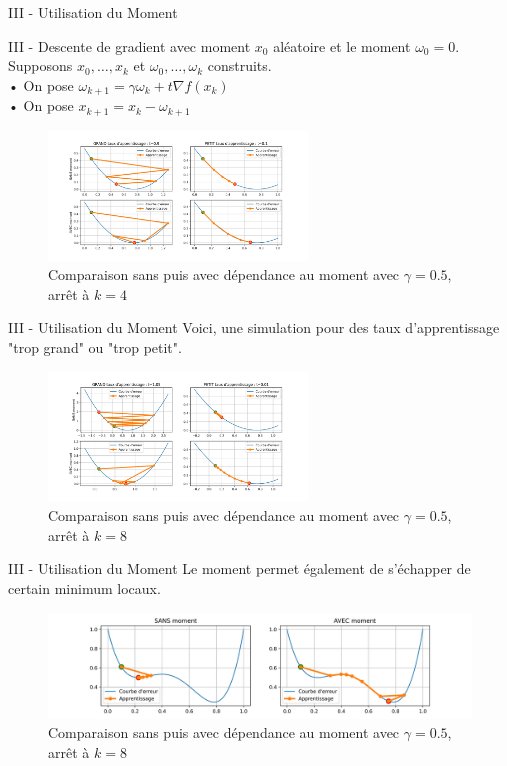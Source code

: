 \documentclass[10pt]{beamer}
\begin{document}
\begin{frame}{III - Utilisation du Moment}
\begin{block}{III - Descente de gradient avec moment}
$x_0$ aléatoire et le moment $\omega_0 = 0$.
Supposons $x_0, \ldots, x_k$ et $\omega_0, \ldots, \omega_k$ construits. \\
    • On pose $\omega_{k+1} = \gamma \omega_k + t \nabla f(x_k)$ \\
    • On pose $x_{k+1} = x_k - \omega_{k+1}$ 
\end{block}
\begin{figure}
	\centering
    \includegraphics[height=130px, trim=0 35 0 35, clip]{3-Moment.jpg}
	\caption{Comparaison sans puis avec dépendance au moment avec $\gamma = 0.5$, arrêt à $k=4$}
\end{figure}
\end{frame}

\begin{frame}{III - Utilisation du Moment}
Voici, une simulation pour des taux d'apprentissage "trop grand" ou "trop petit".
\begin{figure}
	\centering
    \includegraphics[height=130px, trim=0 35 0 35, clip]{4-Moment.jpg}
	\caption{Comparaison sans puis avec dépendance au moment avec $\gamma = 0.5$, arrêt à $k=8$}
\end{figure}
\end{frame}

\begin{frame}{III - Utilisation du Moment}
Le moment permet également de s'échapper de certain minimum locaux.
\begin{figure}
	\centering
    \includegraphics[width=\textwidth, trim=0 10 0 10, clip]{5-Moment.jpg}
	\caption{Comparaison sans puis avec dépendance au moment avec $\gamma = 0.5$, arrêt à $k=8$}
\end{figure}
\end{frame}
\end{document}

